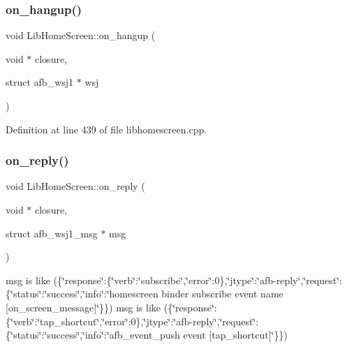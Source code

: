 \subsubsection{\texorpdfstring{on\+\_\+hangup()}{on\_hangup()}}
{\footnotesize\ttfamily void Lib\+Home\+Screen\+::on\+\_\+hangup (\begin{DoxyParamCaption}\item[{void $\ast$}]{closure,  }\item[{struct afb\+\_\+wsj1 $\ast$}]{wsj }\end{DoxyParamCaption})}



Definition at line 439 of file libhomescreen.\+cpp.


\mbox{\label{class_lib_home_screen_a248d9648c6186287a7632ec1c75fc9c5}} 
\subsubsection{\texorpdfstring{on\+\_\+reply()}{on\_reply()}}
{\footnotesize\ttfamily void Lib\+Home\+Screen\+::on\+\_\+reply (\begin{DoxyParamCaption}\item[{void $\ast$}]{closure,  }\item[{struct afb\+\_\+wsj1\+\_\+msg $\ast$}]{msg }\end{DoxyParamCaption})}

msg is like (\{\char`\"{}response\char`\"{}\+:\{\char`\"{}verb\char`\"{}\+:\char`\"{}subscribe\char`\"{},\char`\"{}error\char`\"{}\+:0\},\char`\"{}jtype\char`\"{}\+:\char`\"{}afb-\/reply\char`\"{},\char`\"{}request\char`\"{}\+:\{\char`\"{}status\char`\"{}\+:\char`\"{}success\char`\"{},\char`\"{}info\char`\"{}\+:\char`\"{}homescreen binder subscribe event name \mbox{[}on\+\_\+screen\+\_\+message\mbox{]}\char`\"{}\}\}) msg is like (\{\char`\"{}response\char`\"{}\+:\{\char`\"{}verb\char`\"{}\+:\char`\"{}tap\+\_\+shortcut\char`\"{},\char`\"{}error\char`\"{}\+:0\},\char`\"{}jtype\char`\"{}\+:\char`\"{}afb-\/reply\char`\"{},\char`\"{}request\char`\"{}\+:\{\char`\"{}status\char`\"{}\+:\char`\"{}success\char`\"{},\char`\"{}info\char`\"{}\+:\char`\"{}afb\+\_\+event\+\_\+push event \mbox{[}tap\+\_\+shortcut\mbox{]}\char`\"{}\}\}) 

